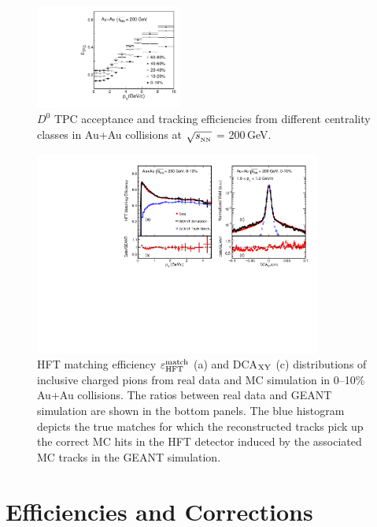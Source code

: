 \documentclass[%
 reprint,	
 amsmath,amssymb,
 aps,
 prc,
]{revtex4-1}
\begin{document}
\begin{figure}
\centering
\includegraphics[width=0.43\textwidth]{fig/Datad0Eff_tpc_10.pdf}
  \caption{$D^{0}$ TPC acceptance and tracking efficiencies from different centrality classes in Au+Au collisions at $\sqrt{s_{_{\rm NN}}}$ = 200\,GeV.}
\label{fig:Datad0Eff_tpc} 
\end{figure}

\begin{figure}
\centering
\includegraphics[width=0.84\textwidth]{fig/HijingRatioDca.pdf}
\caption{HFT matching efficiency $\varepsilon_{\rm HFT}^{\rm match}$ (a) and DCA$_{\rm XY}$ (c) distributions of inclusive charged pions from real data and MC simulation in 0--10\% Au+Au collisions. The ratios between real data and GEANT simulation are shown in the bottom panels. The blue histogram depicts the true matches for which the reconstructed tracks pick up the correct MC hits in the HFT detector induced by the associated MC tracks in the GEANT simulation.}
\label{fig:HijingRatioDca} 
\end{figure}

\section{Efficiencies and Corrections}
\label{correction}
\end{document}
